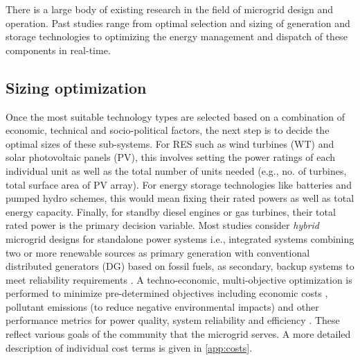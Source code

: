 \documentclass[final,3p,times]{elsarticle}
\begin{document}
There is a large body of existing research in the field of microgrid design and operation. Past studies range from optimal selection and sizing of generation and storage technologies to optimizing the energy management and dispatch of these components in real-time. 

\subsection{Sizing optimization}

Once the most suitable technology types are selected based on a combination of economic, technical and socio-political factors, the next step is to decide the optimal sizes of these sub-systems. For RES such as wind turbines (WT) and solar photovoltaic panels (PV), this involves setting the power ratings of each individual unit as well as the total number of units needed (e.g., no. of turbines, total surface area of PV array). For energy storage technologies like batteries and pumped hydro schemes, this would mean fixing their rated powers as well as total energy capacity. Finally, for standby diesel engines or gas turbines, their total rated power is the primary decision variable. Most studies consider \textit{hybrid} microgrid designs for standalone power systems i.e., integrated systems combining two or more renewable sources as primary generation with conventional distributed generators (DG) based on fossil fuels, as secondary, backup systems to meet reliability requirements \cite{kaabeche2014} \cite{bhandari2014}. A techno-economic, multi-objective optimization is performed to minimize pre-determined objectives including economic costs \cite{tazvinga2013}, pollutant emissions (to reduce negative environmental impacts) and other performance metrics for power quality, system reliability and efficiency \cite{kaabeche2011a}. These reflect various goals of the community that the microgrid serves. A more detailed description of individual cost terms is given in \cref{app:costs}.
 
\end{document}

